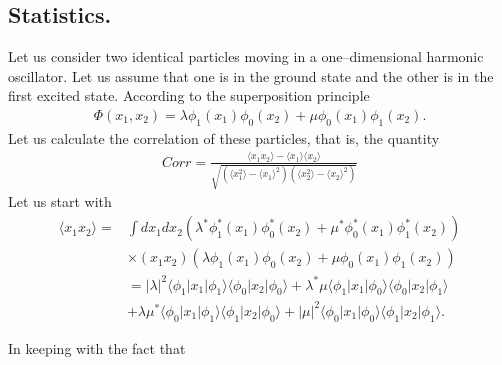 \begin{subappendices}
\section{Statistics.}\label{App6D}
Let us consider two identical particles moving in a one--dimensional harmonic oscillator. Let us assume  that one is in the ground state and the other  is in the first excited state. According to the superposition principle 
\begin{align}\label{eqApp6G1}
\Phi(x_1,x_2)=\lambda\phi_1(x_1)\phi_0(x_2)+\mu\phi_0(x_1)\phi_1(x_2).
\end{align} 
Let us calculate the correlation of these particles, that is, the quantity
\begin{align}\label{eqApp6G2}
Corr=\frac{\langle x_1x_2\rangle-\langle x_1\rangle\langle x_2\rangle}{\sqrt{\left(\langle x_1^2\rangle-\langle x_1\rangle^2\right)\left(\langle x_2^2\rangle-\langle x_2\rangle^2\right)}}
\end{align} 
Let us start with
\begin{align}\label{eqApp63}
\nonumber\langle x_1x_2\rangle=&\int dx_1 dx_2 \left(\lambda^*\phi_1^*(x_1)\phi_0^*(x_2)+\mu^*\phi_0^*(x_1)\phi_1^*(x_2)\right)\\
\nonumber&\times(x_1 x_2)\left(\lambda\phi_1(x_1)\phi_0(x_2)+\mu\phi_0(x_1)\phi_1(x_2)\right)\\
\nonumber &=|\lambda|^2\langle\phi_1|x_1|\phi_1\rangle\langle\phi_0|x_2|\phi_0\rangle+\lambda^*\mu\langle\phi_1|x_1|\phi_0\rangle\langle\phi_0|x_2|\phi_1\rangle\\
&+\lambda\mu^*\langle\phi_0|x_1|\phi_1\rangle\langle\phi_1|x_2|\phi_0\rangle+|\mu|^2\langle\phi_0|x_1|\phi_0\rangle\langle\phi_1|x_2|\phi_1\rangle.
\end{align} 

In keeping with the fact that


\end{subappendices}
